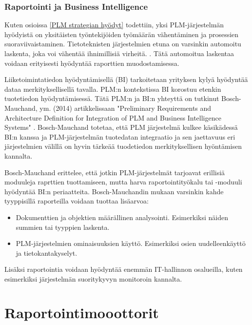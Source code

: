 \subsubsection{Raportointi ja Business Intelligence}

Kuten osioissa \ref{PLM strategian hyödyt} todettiin, yksi PLM-järjestelmän hyödyistä on yksitäisten työntekijöiden työmäärän vähentäminen ja prosessien suoraviivaistaminen. Tietoteknisten järjestelmien etuna on varsinkin automoitu laskenta, joka voi vähentää ihnimillisiä virheitä. \cite{niu_organizational_2021}.  \cite{rakovic_digital_2022} Tätä automoitua laskentaa voidaan erityisesti hyödyntää raporttien muodostamisessa.

Liiketoimintatiedon hyödyntämisellä (BI) tarkoitetaan yrityksen kylyä hyödyntää dataa merkityksellisellä tavalla. PLM:n kontekstissa BI korostuu etenkin tuotetiedon hyödyntämisessä. Tätä PLM:n ja BI:n yhteyttä on tutkinut Bosch-Mauchand, ym. (2014) artikkelissaan "Preliminary Requirements and Architecture Definition for Integration of PLM and Business Intelligence Systems" \cite{bayro-corrochano_preliminary_2014}. Bosch-Mauchand totetaa, että PLM järjestelmä kulkee käsikädessä BI:n kanssa ja PLM-järjestelmän tuotedatan integraatio ja sen jaettavuus eri järjestelmien välillä on hyvin tärkeää tuodetiedon merkityksellisen hyöntämisen kannalta.

Bosch-Mauchand erittelee, että jotkin PLM-järjestelmät tarjoavat erillisiä moduuleja raprttien tuottamiseen, mutta harva raportointityökalu tai -moduuli hyödyntää BI:n periaatteita. Bosch-Mauchandin mukaan varsinkin kahde tyyppisillä raporteilla voidaan tuottaa lisäarvoa:

\begin{itemize}
	\item Dokumenttien ja objektien määrällinen analysointi. Esimerkiksi näiden summien tai tyyppien laskenta.
	\item PLM-järjestelmien ominaisuuksien käyttö. Esimerkiksi osien uudelleenkäyttö ja tietokantakyselyt.
\end{itemize}
\cite{bayro-corrochano_preliminary_2014}

Lisäksi raportointia voidaan hyödyntää enemmän IT-hallinnon osalueilla, kuten esimerkiksi järjestelmän suoritykyvyn monitoroin kannalta.


\section{Raportointimooottorit} \label{Raportointimoottorit}

